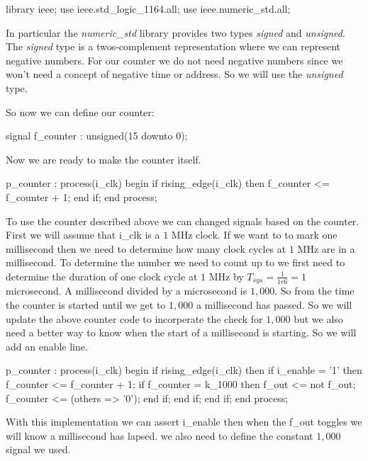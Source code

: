 \begin{VHDLlisting}[tabsize=8]
library ieee;
	use ieee.std_logic_1164.all;
	use ieee.numeric_std.all;
\end{VHDLlisting}

In particular the \emph{numeric\_std} library provides two types \emph{signed} and \emph{unsigned}. The \emph{signed} type is a twos-complement representation where we can represent negative numbers. For our counter we do not need negative numbers since we won't need a concept of negative time or address. So we will use the \emph{unsigned} type. 

So now we can define our counter:

\begin{VHDLlisting}[tabsize=8]
signal f_counter : unsigned(15 downto 0);
\end{VHDLlisting}

Now we are ready to make the counter itself.

\begin{VHDLlisting}[tabsize=8]
p_counter : process(i_clk) 
begin
	if rising_edge(i_clk) then
		f_counter <= f_counter + 1;
	end if;
end process;
\end{VHDLlisting}

To use the counter described above we can changed signals based on the counter. First we will assume that i\_clk is a $1$ \ac{MHz} clock. If we want to to mark one millisecond then we need to determine how many clock cycles at $1$ \ac{MHz} are in a millisecond. To determine the number we need to count up to we first need to determine the duration of one clock cycle at $1$ \ac{MHz} by $T_{sys}=\frac{1}{1e6}=1$ microsecond. A millisecond divided by a microsecond is $1,000$. So from the time the counter is started until we get to $1,000$ a millisecond has passed. So we will update the above counter code to incorperate the check for $1,000$ but we also need a better way to know when the start of a millisecond is starting. So we will add an enable line.

\begin{VHDLlisting}[tabsize=8]
p_counter : process(i_clk) 
begin
	if rising_edge(i_clk) then
		if i_enable = '1' then
			f_counter <= f_counter + 1;
			if f_counter = k_1000 then
				f_out <= not f_out;
				f_counter <= (others => '0');
			end if;
		end if;
	end if;
end process;
\end{VHDLlisting}

With this implementation we can assert i\_enable then when the f\_out toggles we will know a millisecond has lapsed. we also need to define the constant $1,000$ signal we used. 


